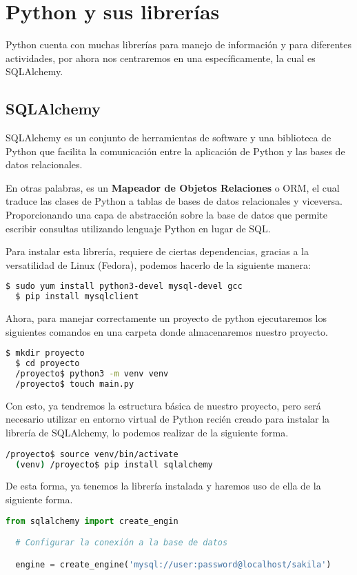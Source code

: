 \documentclass[12pt]{article}
\begin{document}
\section{Python y sus librerías}

Python cuenta con muchas librerías para manejo de información y para diferentes actividades, por ahora nos centraremos en una específicamente, la cual es SQLAlchemy.

\subsection{SQLAlchemy}

SQLAlchemy es un conjunto de herramientas de software y una biblioteca de Python que facilita la comunicación entre la aplicación de Python y las bases de datos relacionales. 

En otras palabras, es un \textbf{Mapeador de Objetos Relaciones} o ORM, el cual traduce las clases de Python a tablas de bases de datos relacionales y viceversa. Proporcionando una capa de abstracción sobre la base de datos que permite escribir consultas utilizando lenguaje Python en lugar de SQL.

Para instalar esta librería, requiere de ciertas dependencias, gracias a la versatilidad de Linux (Fedora), podemos hacerlo de la siguiente manera:

\begin{lstlisting}[language=Bash]
  $ sudo yum install python3-devel mysql-devel gcc
  $ pip install mysqlclient
\end{lstlisting}

Ahora, para manejar correctamente un proyecto de python ejecutaremos los siguientes comandos en una carpeta donde almacenaremos nuestro proyecto.

\begin{lstlisting}[language=Bash]
  $ mkdir proyecto
  $ cd proyecto
  /proyecto$ python3 -m venv venv
  /proyecto$ touch main.py
\end{lstlisting}
\vspace{12pt}

Con esto, ya tendremos la estructura básica de nuestro proyecto, pero será necesario utilizar en entorno virtual de Python recién creado para instalar la librería de SQLAlchemy, lo podemos realizar de la siguiente forma.

\begin{lstlisting}[language=Bash]
  /proyecto$ source venv/bin/activate
  (venv) /proyecto$ pip install sqlalchemy
\end{lstlisting}
\vspace{12pt}

De esta forma, ya tenemos la librería instalada y haremos uso de ella de la siguiente forma.

\begin{lstlisting}[language=Python]
  from sqlalchemy import create_engin

  # Configurar la conexión a la base de datos

  engine = create_engine('mysql://user:password@localhost/sakila')
\end{lstlisting}
\vspace{12pt}
\end{document}
